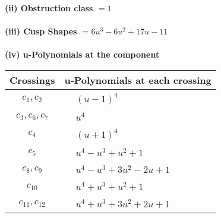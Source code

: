 \documentclass[1p]{elsarticle_modified}
\theoremstyle{definition}
\begin{document}
\flushleft \textbf{(ii) Obstruction class $= 1$}\\~\\
\flushleft \textbf{(iii) Cusp Shapes $= 6 u^3-6 u^2+17 u-11$}\\~\\
\newpage\renewcommand{\arraystretch}{1}
\flushleft \textbf{(iv) u-Polynomials at the component}\newline \\
\begin{tabular}{m{50pt}|m{274pt}}
Crossings & \hspace{64pt}u-Polynomials at each crossing \\
\hline $$\begin{aligned}c_{1},c_{2}\end{aligned}$$&$\begin{aligned}
&(u-1)^4
\end{aligned}$\\
\hline $$\begin{aligned}c_{3},c_{6},c_{7}\end{aligned}$$&$\begin{aligned}
&u^4
\end{aligned}$\\
\hline $$\begin{aligned}c_{4}\end{aligned}$$&$\begin{aligned}
&(u+1)^4
\end{aligned}$\\
\hline $$\begin{aligned}c_{5}\end{aligned}$$&$\begin{aligned}
&u^4- u^3+u^2+1
\end{aligned}$\\
\hline $$\begin{aligned}c_{8},c_{9}\end{aligned}$$&$\begin{aligned}
&u^4- u^3+3 u^2-2 u+1
\end{aligned}$\\
\hline $$\begin{aligned}c_{10}\end{aligned}$$&$\begin{aligned}
&u^4+u^3+u^2+1
\end{aligned}$\\
\hline $$\begin{aligned}c_{11},c_{12}\end{aligned}$$&$\begin{aligned}
&u^4+u^3+3 u^2+2 u+1
\end{aligned}$\\
\hline
\end{tabular}\\~\\
\end{document}
